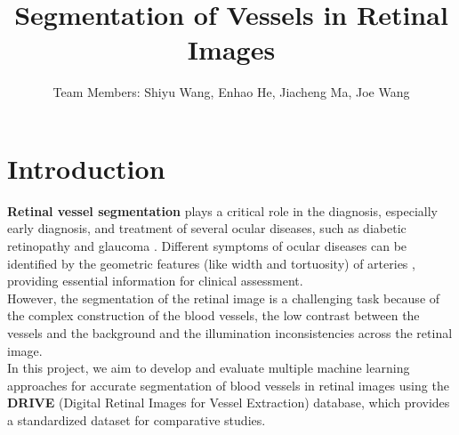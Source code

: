 \documentclass[12pt,letterpaper]{article}
\begin{document}
\title{\textbf{Segmentation of Vessels in Retinal Images}}
\author{Team Members: Shiyu Wang, Enhao He, Jiacheng Ma, Joe Wang}
\date{}
\setlength{\droptitle}{-2.75cm}
\maketitle
\vspace{-2cm}



\section{Introduction}
\textbf{Retinal vessel segmentation} plays a critical role in the diagnosis, especially early diagnosis, and treatment of several ocular diseases, such as diabetic retinopathy and glaucoma \cite{1}. Different symptoms of ocular diseases can be identified by the geometric features (like width and tortuosity) of arteries \cite{review2022}, providing essential information for clinical assessment. \\
However, the segmentation of the retinal image is a challenging task because of the complex construction of the blood vessels, the low contrast between the vessels and the background and the illumination inconsistencies across the retinal image. \\ 
In this project, we aim to develop and evaluate multiple machine learning approaches for accurate segmentation of blood vessels in retinal images using the \textbf{DRIVE} (Digital Retinal Images for Vessel Extraction) database, which provides a standardized dataset for comparative studies.
\end{document}
